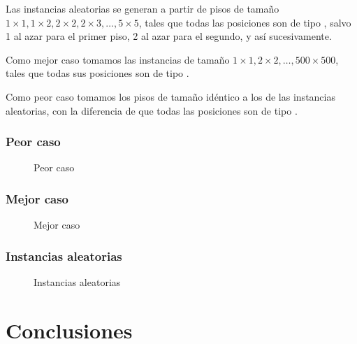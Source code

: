 \documentclass[a4paper, 10pt, twoside]{article}
\begin{document}
Las instancias aleatorias se generan a partir de pisos de tamaño $1 \times 1, 1 \times 2, 2 \times 2, 2 \times 3, \ldots, 5 \times 5$, tales que todas las posiciones son de tipo \Pared, salvo 1 al azar para el primer piso, 2 al azar para el segundo, y así sucesivamente.

Como mejor caso tomamos las instancias de tamaño $1 \times 1, 2 \times 2, \ldots, 500 \times 500$, tales que todas sus posiciones son de tipo \Pared.

Como peor caso tomamos los pisos de tamaño idéntico a los de las instancias aleatorias, con la diferencia de que todas las posiciones son de tipo \Libre.


\subsubsection{Peor caso}

\begin{figure}[H]
  \centering
  
  \caption{Peor caso}
\end{figure}


\subsubsection{Mejor caso}

\begin{figure}[H]
  \centering
  
  \caption{Mejor caso}
\end{figure}


\subsubsection{Instancias aleatorias}

\begin{figure}[H]
  \centering
  
  \caption{Instancias aleatorias}
\end{figure}




\newpage

\section{Conclusiones}
\end{document}
